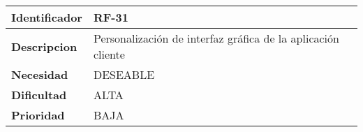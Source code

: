 \begin{center}
    \begin{tabular}{|p{2.6cm}|p{12cm}|}
    \hline
    \textbf{Identificador} & RF-31\\
    \hline
    \textbf{Descripcion} & Personalización de interfaz gráfica de la aplicación cliente\\
    \hline
    \textbf{Necesidad} & DESEABLE\\
    \hline
    \textbf{Dificultad} & ALTA\\
    \hline
    \textbf{Prioridad} & BAJA\\
    \hline
    \end{tabular}
\end{center}
